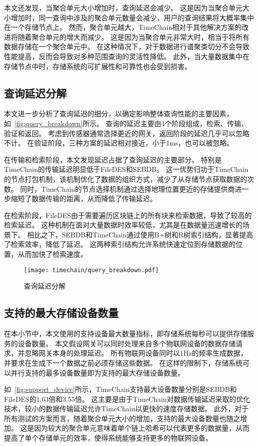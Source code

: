 本文还发现，当聚合单元大小增加时，查询延迟会减少。
这是因为当聚合单元大小增加时，同一查询中涉及的聚合单元数量会减少，用户的查询结果将大概率集中在一个存储节点上。
然而，聚合单元越大，TimeChain相对于其他解决方案的改进将随着聚合单元的增大而减少。
这是因为当聚合单元非常大时，相当于将所有数据存储在一个聚合单元中。
在这种情况下，对于数据进行谱聚类切分不会导致性能提高，反而会导致对多种范围查询的灵活性降低。
此外，当大量数据集中在存储节点中时，存储系统的可扩展性和可靠性也会受到损害。

\subsection{查询延迟分解}
本文进一步分析了查询延迟的细分，以确定影响整体查询性能的主要因素，如~\autoref{fig:query_breakdown}所示。
查询的延迟主要由4个阶段组成，检索、传输、验证和返回。
考虑到传感器通常选择更近的网关，返回阶段的延迟几乎可以忽略不计。
在验证阶段，三种方案的延迟相对接近，小于1ms，也可以被忽略。

在传输和检索阶段，本文发现延迟占据了查询延迟的主要部分。
特别是TimeChain的传输延迟明显低于FileDES和SEBDB。
这一优势归功于TimeChain的节点打包机制，该机制优化了数据的组织方式，减少了从存储节点获取数据的次数。
同时，TimeChain的节点选择机制通过选择地理位置更近的存储提供商进一步缩短了数据传输的距离，从而降低了传输延迟。

在检索阶段，FileDES由于需要遍历区块链上的所有块来检索数据，导致了较高的检索延迟。
这种机制在面对大量数据时效率较低，尤其是在数据量迅速增长的场景下。
相比之下，SEBDB和TimeChain通过使用B+树和R树索引结构，显著提高了检索效率，降低了延迟。
这两种索引结构允许系统快速定位到存储数据的位置，从而加快了检索速度。
\begin{figure}[t]
    \centering
    \texttt{[image: timechain/query\_breakdown.pdf]}
    \caption{查询延迟分解}
    \label{fig:query_breakdown}
\end{figure}

\subsection{支持的最大存储设备数量}
在本小节中，本文使用的支持设备最大数量指标，即存储系统每秒可以提供存储服务的设备数量。
本文假设网关可以同时处理来自多个物联网设备的数据存储请求，并忽略网关本身的处理延迟。
所有物联网设备同时以1Hz的频率生成数据，并要求在生成下一个数据之前必须存储这些数据。
在这样的限制下，存储系统可以并行支持的最多设备数量即为支持的最大存储设备数量。

如~\autoref{fig:support_device}所示，TimeChain支持最大设备数量分别是SEBDB和FileDES的1.63倍和3.55倍。
这主要是由于TimeChain对数据传输延迟采取的优化技术，较小的数据传输延迟允许TimeChain以更快的速度存储数据。
此外，对于所有测试的方案而言，随着聚合单元大小的增加，支持的最大设备数量也随之增加。
这是因为较大的聚合单元意味着单个链上哈希可以代表更多的数据量，从而提高了单个存储单元的效率，使得系统能够支持更多的物联网设备。

